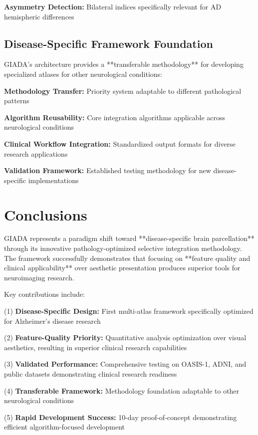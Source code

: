 \documentclass[a4paper,11pt]{article}
\begin{document}
\textbf{Asymmetry Detection:} Bilateral indices specifically relevant for AD hemispheric differences

\subsection{Disease-Specific Framework Foundation}

GIADA's architecture provides a **transferable methodology** for developing specialized atlases for other neurological conditions:

\textbf{Methodology Transfer:} Priority system adaptable to different pathological patterns

\textbf{Algorithm Reusability:} Core integration algorithms applicable across neurological conditions

\textbf{Clinical Workflow Integration:} Standardized output formats for diverse research applications

\textbf{Validation Framework:} Established testing methodology for new disease-specific implementations

\section{Conclusions}

GIADA represents a paradigm shift toward **disease-specific brain parcellation** through its innovative pathology-optimized selective integration methodology. The framework successfully demonstrates that focusing on **feature quality and clinical applicability** over aesthetic presentation produces superior tools for neuroimaging research.

Key contributions include:

(1) \textbf{Disease-Specific Design:} First multi-atlas framework specifically optimized for Alzheimer's disease research

(2) \textbf{Feature-Quality Priority:} Quantitative analysis optimization over visual aesthetics, resulting in superior clinical research capabilities

(3) \textbf{Validated Performance:} Comprehensive testing on OASIS-1, ADNI, and public datasets demonstrating clinical research readiness

(4) \textbf{Transferable Framework:} Methodology foundation adaptable to other neurological conditions

(5) \textbf{Rapid Development Success:} 10-day proof-of-concept demonstrating efficient algorithm-focused development
\end{document}
